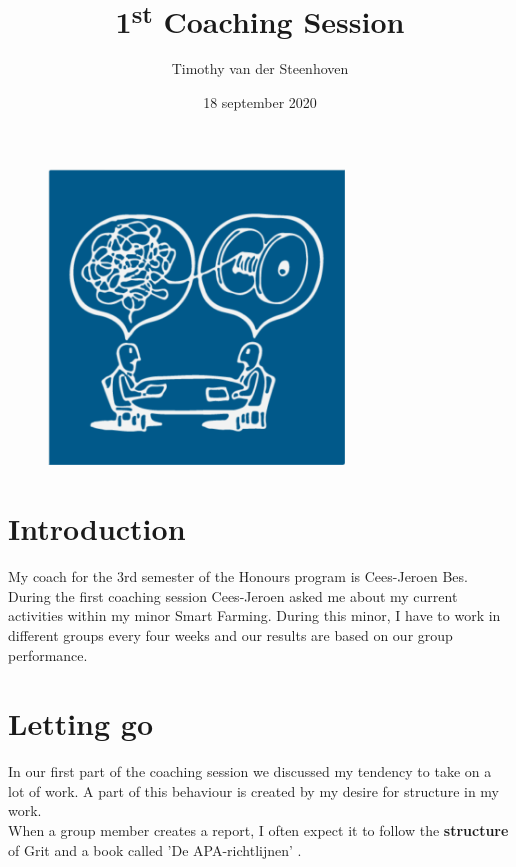 \documentclass[11pt]{article}
\title{\textbf{1\textsuperscript{st} Coaching Session}}
\author{Timothy van der Steenhoven}
\date{18 september 2020}
\begin{document}
	\maketitle
	\begin{figure}[H]
		\centering
		\includegraphics[width=0.7\textwidth]{coaching-square-background-320x320}
	\end{figure}
	\thispagestyle{empty}
	\newpage
	
	\section*{Introduction}
	My coach for the 3rd semester of the Honours program is Cees-Jeroen Bes.\\
	
	During the first coaching session Cees-Jeroen asked me about my current activities within my minor Smart Farming. During this minor, I have to work in different groups every four weeks and our results are based on our group performance.\\
	
	\section{Letting go}
	In our first part of the coaching session we discussed my tendency to take on a lot of work. A part of this behaviour is created by my desire for structure in my work. \\
	
	When a group member creates a report, I often expect it to follow the \textbf{structure} of Grit \cite{Grit2011} and a book called 'De APA-richtlijnen' \cite{Poelmans2013}. \\
	
\end{document}
